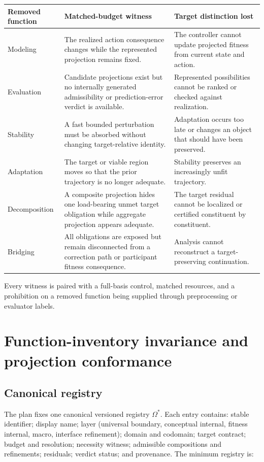 \documentclass[11pt]{article}
\newcommand{\InvReg}{\Omega^{\ast}}
\begin{document}
\begin{longtable}{p{}p{}p{}}
\toprule
\textbf{Removed function} & \textbf{Matched-budget witness} & \textbf{Target distinction lost}\\
\midrule\endhead
Modeling & The realized action consequence changes while the represented projection remains fixed. & The controller cannot update projected fitness from current state and action.\\
Evaluation & Candidate projections exist but no internally generated admissibility or prediction-error verdict is available. & Represented possibilities cannot be ranked or checked against realization.\\
Stability & A fast bounded perturbation must be absorbed without changing target-relative identity. & Adaptation occurs too late or changes an object that should have been preserved.\\
Adaptation & The target or viable region moves so that the prior trajectory is no longer adequate. & Stability preserves an increasingly unfit trajectory.\\
Decomposition & A composite projection hides one load-bearing unmet target obligation while aggregate projection appears adequate. & The target residual cannot be localized or certified constituent by constituent.\\
Bridging & All obligations are exposed but remain disconnected from a correction path or participant fitness consequence. & Analysis cannot reconstruct a target-preserving continuation.\\
\bottomrule
\end{longtable}
Every witness is paired with a full-basis control, matched resources, and a prohibition on a removed function being supplied through preprocessing or evaluator labels.

\section{Function-inventory invariance and projection conformance}

\subsection{Canonical registry}

The plan fixes one canonical versioned registry $\InvReg$. Each entry contains: stable identifier; display name; layer (universal boundary, conceptual internal, fitness internal, macro, interface refinement); domain and codomain; target contract; budget and resolution; necessity witness; admissible compositions and refinements; residuals; verdict status; and provenance. The minimum registry is:
\end{document}
